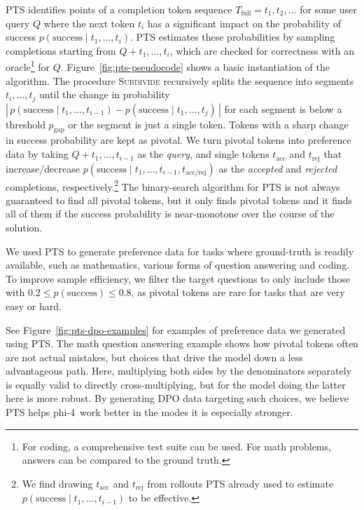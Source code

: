 \documentclass[11pt]{article}
\newcommand{\modelwithoutspace}{\textsf{phi-4}}
\newcommand{\model}{\modelwithoutspace~}
\begin{document}
PTS identifies points of a completion token sequence $T_\mathrm{full}=t_1,t_2,\dotsc$ for some user query $Q$ where the next token $t_i$ has a significant impact on the probability of success $p(\mathrm{success} \mid t_1,\dotsc,t_i)$.
PTS estimates these probabilities by sampling completions starting from $Q+t_1,\dotsc,t_i$, which are checked for correctness with an oracle\footnote{For coding, a comprehensive test suite can be used. For math problems, answers can be compared to the ground truth.} for $Q$. Figure~\ref{fig:pts-pseudocode} shows a basic instantiation of the algorithm. The procedure \textsc{Subdivide} recursively splits the sequence into segments $t_i,\dotsc,t_j$ until the change in probability $\left|\,p(\mathrm{success} \mid t_1,\dotsc,t_{i-1}) - p(\mathrm{success} \mid t_1,\dotsc,t_j)\,\right|$ for each segment is below a threshold $p_{\mathrm{gap}}$ or the segment is just a single token. Tokens with a sharp change in success probability are kept as pivotal.
We turn pivotal tokens into preference data by taking $Q + t_1,\dotsc,t_{i-1}$ as the \emph{query}, and single tokens $t_{\mathrm{acc}}$ and $t_{\mathrm{rej}}$ that increase/decrease $p(\mathrm{success} \mid t_1,\dotsc,t_{i-1}, t_{\mathrm{acc/rej}})$ as the \emph{accepted} and \emph{rejected} completions, respectively.\footnote{We find drawing $t_{\mathrm{acc}}$ and $t_{\mathrm{rej}}$ from rollouts PTS already used to estimate $p(\mathrm{success} \mid t_1,\dotsc,t_{i-1})$ to be effective.}  The binary-search algorithm for PTS is not always guaranteed to find all pivotal tokens, but it only finds pivotal tokens and it finds all of them if the success probability is near-monotone over the course of the solution.

We used PTS to generate preference data for tasks where ground-truth is readily available, such as mathematics, various forms of question answering and coding.
To improve sample efficiency, we filter the target questions to only include those with $0.2 \leq p(\mathrm{success}) \leq 0.8$, as pivotal tokens are rare for tasks that are very easy or hard.

See Figure~\ref{fig:pts-dpo-examples} for examples of preference data we generated using PTS. The math question answering example shows how pivotal tokens often are not actual mistakes, but choices that drive the model down a less advantageous path. Here, multiplying both sides by the denominators separately is equally valid to directly cross-multiplying, but for the model doing the latter here is more robust. By generating DPO data targeting such choices, we believe PTS helps \model work better in the modes it is especially stronger.
\end{document}
